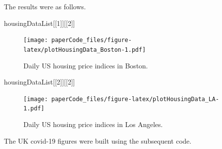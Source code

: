 \documentclass[
]{article}
\newenvironment{Shaded}{\begin{snugshade}}{\end{snugshade}}
\newcommand{\DecValTok}[1]{\textcolor[rgb]{0.00,0.00,0.81}{#1}}
\newcommand{\NormalTok}[1]{#1}
\begin{document}
The results were as follows.

\begin{Shaded}
\begin{Highlighting}[]
\NormalTok{housingDataList[[}\DecValTok{1}\NormalTok{]][[}\DecValTok{2}\NormalTok{]]}
\end{Highlighting}
\end{Shaded}

\begin{figure}
\centering
\texttt{[image: paperCode\_files/figure-latex/plotHousingData\_Boston-1.pdf]}
\caption{Daily US housing price indices in Boston.}
\end{figure}

\begin{Shaded}
\begin{Highlighting}[]
\NormalTok{housingDataList[[}\DecValTok{2}\NormalTok{]][[}\DecValTok{2}\NormalTok{]]}
\end{Highlighting}
\end{Shaded}

\begin{figure}
\centering
\texttt{[image: paperCode\_files/figure-latex/plotHousingData\_LA-1.pdf]}
\caption{Daily US housing price indices in Los Angeles.}
\end{figure}

The UK covid-19 figures were built using the subsequent code.
\end{document}
